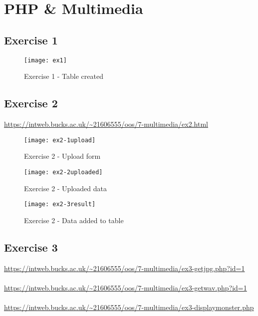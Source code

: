 \chapter{PHP \& Multimedia}
\graphicspath{{7-multimedia/images/}}

\section{Exercise 1}

\begin{figure}[H]
  \caption{Exercise 1 - Table created}
  \centering
  \texttt{[image: ex1]}
\end{figure}

\clearpage
\section{Exercise 2}

\url{https://intweb.bucks.ac.uk/~21606555/oos/7-multimedia/ex2.html}

\captionsetup{type=figure}


\captionsetup{type=figure}


\begin{figure}[H]
  \caption{Exercise 2 - Upload form}
  \centering
  \texttt{[image: ex2-1upload]}
\end{figure}

\begin{figure}[H]
  \caption{Exercise 2 - Uploaded data}
  \centering
  \texttt{[image: ex2-2uploaded]}
\end{figure}

\begin{figure}[H]
  \caption{Exercise 2 - Data added to table}
  \centering
  \texttt{[image: ex2-3result]}
\end{figure}

\clearpage
\section{Exercise 3}

\url{https://intweb.bucks.ac.uk/~21606555/oos/7-multimedia/ex3-getjpg.php?id=1}\\\\
\url{https://intweb.bucks.ac.uk/~21606555/oos/7-multimedia/ex3-getwav.php?id=1}\\\\
\url{https://intweb.bucks.ac.uk/~21606555/oos/7-multimedia/ex3-displaymonster.php}


